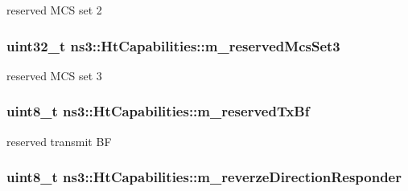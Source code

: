 reserved M\+CS set 2 

\subsubsection[{\texorpdfstring{m\+\_\+reserved\+Mcs\+Set3}{m_reservedMcsSet3}}]{\setlength{\rightskip}{0pt plus 5cm}uint32\+\_\+t ns3\+::\+Ht\+Capabilities\+::m\+\_\+reserved\+Mcs\+Set3\hspace{0.3cm}{\ttfamily [private]}}\hypertarget{classns3_1_1HtCapabilities_ad8417be9a6de31fa230aeb7eb909e09d}{}\label{classns3_1_1HtCapabilities_ad8417be9a6de31fa230aeb7eb909e09d}


reserved M\+CS set 3 

\subsubsection[{\texorpdfstring{m\+\_\+reserved\+Tx\+Bf}{m_reservedTxBf}}]{\setlength{\rightskip}{0pt plus 5cm}uint8\+\_\+t ns3\+::\+Ht\+Capabilities\+::m\+\_\+reserved\+Tx\+Bf\hspace{0.3cm}{\ttfamily [private]}}\hypertarget{classns3_1_1HtCapabilities_a292c85ad03ad15416f0256a660e972e3}{}\label{classns3_1_1HtCapabilities_a292c85ad03ad15416f0256a660e972e3}


reserved transmit BF 

\subsubsection[{\texorpdfstring{m\+\_\+reverze\+Direction\+Responder}{m_reverzeDirectionResponder}}]{\setlength{\rightskip}{0pt plus 5cm}uint8\+\_\+t ns3\+::\+Ht\+Capabilities\+::m\+\_\+reverze\+Direction\+Responder\hspace{0.3cm}{\ttfamily [private]}}\hypertarget{classns3_1_1HtCapabilities_a99da7560f5302107f3835e09940aeddb}{}\label{classns3_1_1HtCapabilities_a99da7560f5302107f3835e09940aeddb}


